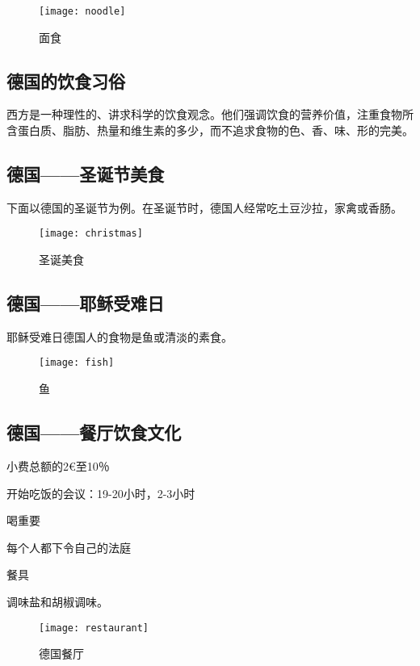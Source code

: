 \begin{figure}[htb]
    \centering
    \texttt{[image: noodle]}
    \caption{面食}
\end{figure}

\subsection{德国的饮食习俗}
    西方是一种理性的、讲求科学的饮食观念。他们强调饮食的营养价值，注重食物所含蛋白质、脂肪、热量和维生素的多少，而不追求食物的色、香、味、形的完美。

\subsection{德国——圣诞节美食}
    下面以德国的圣诞节为例。在圣诞节时，德国人经常吃土豆沙拉，家禽或香肠。

    \begin{figure}[htb]
        \centering
        \texttt{[image: christmas]}
        \caption{圣诞美食}
    \end{figure}  

\subsection{德国——耶稣受难日}
    耶稣受难日德国人的食物是鱼或清淡的素食。 

    \begin{figure}[htb]
        \centering
        \texttt{[image: fish]}
        \caption{鱼}
    \end{figure}  

\subsection{德国——餐厅饮食文化}

\item 小费总额的2€至10％ 
\item 开始吃饭的会议：19-20小时，2-3小时 
\item 喝重要 
\item 每个人都下令自己的法庭 
\item 餐具 
\item 调味盐和胡椒调味。

\begin{figure}[htb]
    \centering
    \texttt{[image: restaurant]}
    \caption{德国餐厅}
\end{figure} 



